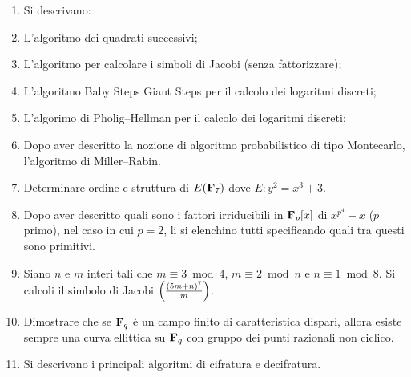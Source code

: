 \documentclass[a4paper,12pt]{article}
\begin{document}
\begin{enumerate}
\item[] Si descrivano:
\item L'algoritmo dei quadrati successivi;
\item L'algoritmo per calcolare i simboli di Jacobi (senza fattorizzare);
\item L'algoritmo Baby Steps Giant Steps per il calcolo dei logaritmi discreti;
\item L'algorimo di Pholig--Hellman per il calcolo dei logaritmi discreti; 
\item Dopo aver descritto la nozione di algoritmo probabilistico di tipo Montecarlo, l'algoritmo di Miller--Rabin.  
\item Determinare ordine e struttura di $E({\bf F}_7)$ dove $E: y^2=x^3+3$.
\item Dopo aver descritto quali sono i fattori irriducibili in ${\bf F}_p[x]$ di $x^{p^4}-x$ ($p$ primo), nel caso in cui $p=2$, li
si elenchino tutti specificando quali tra questi sono primitivi.
\item Siano $n$ e $m$ interi tali che $m\equiv3\bmod4$, $m\equiv2\bmod n$ e $n\equiv1\bmod8$. Si calcoli il simbolo di Jacobi
$\left({(5m+n)^7\over m}\right)$.
\item Dimostrare che se ${\bf F}_q$ \`e un campo finito di caratteristica dispari,
allora esiste sempre una curva ellittica su ${\bf F}_q$ con gruppo dei punti razionali non ciclico.
\item Si descrivano i principali algoritmi di cifratura e decifratura.
\end{enumerate}
\end{document}
